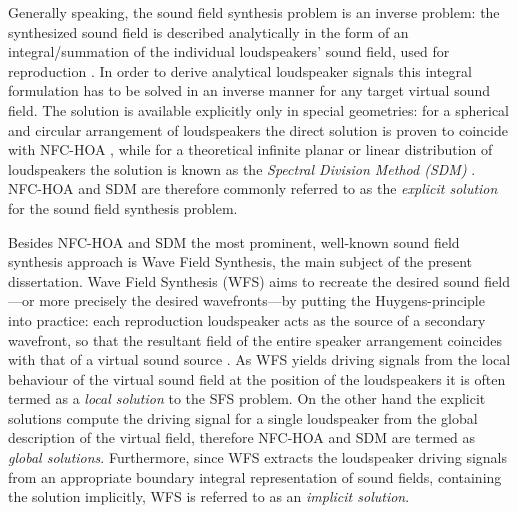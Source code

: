 Generally speaking, the sound field synthesis problem is an inverse problem: the synthesized sound field is described analytically in the form of an integral/summation of the individual loudspeakers' sound field, used for reproduction \cite{Ahrens2010phd, Ahrens2012, fazi2008surround, Fazi2010}.
In order to derive analytical loudspeaker signals this integral formulation has to be solved in an inverse manner for any target virtual sound field.
The solution is available explicitly only in special geometries: for a spherical and circular arrangement of loudspeakers the direct solution is proven to coincide with NFC-HOA \cite{Daniel2003, fazi2008surround, Fazi2010, poletti2005three, 943347, Ahrens2008:Analytical_Circ_Spherical_SFS, Ahrens2011:icassp}, while for a theoretical infinite planar or linear distribution of loudspeakers the solution is known as the \emph{Spectral Division Method (SDM)} \cite{Ahrens2010a, Ahrens2012:Ambisonics_for_planar_linear, Ahrens2012} .
NFC-HOA and SDM are therefore commonly referred to as the \emph{explicit solution} for the sound field synthesis problem.

Besides NFC-HOA and SDM the most prominent, well-known sound field synthesis approach is Wave Field Synthesis, the main subject of the present dissertation.
Wave Field Synthesis (WFS) aims to recreate the desired sound field---or more precisely the desired wavefronts---by putting the Huygens-principle into practice: 
each reproduction loudspeaker acts as the source of a secondary wavefront, so that the resultant field of the entire speaker arrangement coincides with that of a virtual sound source \cite{Berkhout1993:Acoustic_control_by_WFS, Verheijen1997:phd, Ahrens2012}.
As WFS yields driving signals from the local behaviour of the virtual sound field at the position of the loudspeakers it is often termed as a \emph{local solution} to the SFS problem.
On the other hand the explicit solutions compute the driving signal for a single loudspeaker from the global description of the virtual field, therefore NFC-HOA and SDM are termed as \emph{global solutions}.
Furthermore, since WFS extracts the loudspeaker driving signals from an appropriate boundary integral representation of sound fields, containing the solution implicitly, WFS is referred to as an \emph{implicit solution}.

